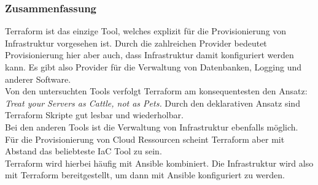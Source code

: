 \subsubsection{Zusammenfassung}\label{iac_zusammenfassung}

Terraform ist das einzige Tool, welches explizit für die Provisionierung von Infrastruktur vorgesehen ist.
Durch die zahlreichen Provider bedeutet Provisionierung hier aber auch, dass Infrastruktur damit konfiguriert werden kann.
Es gibt also Provider für die Verwaltung von Datenbanken, Logging und anderer Software. \\

Von den untersuchten Tools verfolgt Terraform am konsequentesten den Ansatz: \textit{Treat your Servers as Cattle, not as Pets.}
Durch den deklarativen Ansatz sind Terraform Skripte gut lesbar und wiederholbar. \\

Bei den anderen Tools ist die Verwaltung von Infrastruktur ebenfalls möglich.
Für die Provisionierung von Cloud Ressourcen scheint Terraform aber mit Abstand das beliebteste IaC Tool zu sein. \\

Terraform wird hierbei häufig mit Ansible kombiniert.
Die Infrastruktur wird also mit Terraform bereitgestellt, um dann mit Ansible konfiguriert zu werden.


%
%
%





















